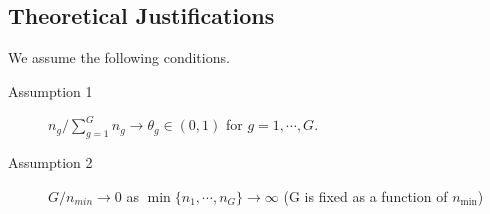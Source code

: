 \documentclass[times,sort&compress,3p]{elsarticle}
\theoremstyle{plain}%
\theoremstyle{definition}
\newcommand{\rsz}[1]{\textcolor{red}{#1}}
\begin{document}
\subsection{Theoretical Justifications} 
We assume the following conditions.
\begin{description}
  \item[Assumption 1] $n_g /\sum_{g=1}^{G}n_g \rightarrow \theta_g \in (0, 1)$ for $g=1,\cdots, G$. 
  \item[Assumption 2] $G / n_{min} \rightarrow 0$ as $\min\{ n_1, \cdots, n_G \} \rightarrow \infty$ (G is fixed as a function of $n_{\min}$)
\end{description}
\end{document}
